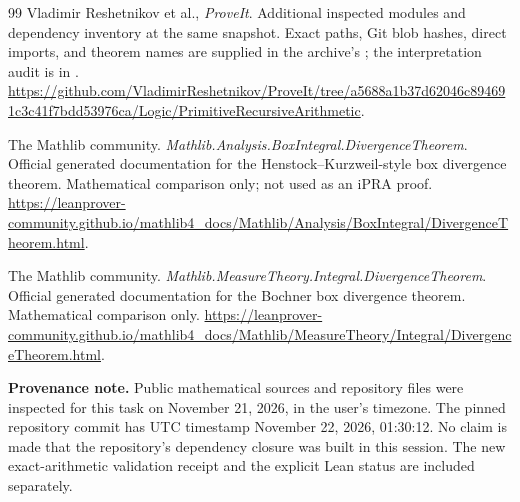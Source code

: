 \begin{thebibliography}{99}
Vladimir Reshetnikov et al., \emph{ProveIt}.
Additional inspected modules and dependency inventory at the same
snapshot. Exact paths, Git blob hashes, direct imports, and theorem
names are supplied in the archive's
;
the interpretation audit is in
.
\url{https://github.com/VladimirReshetnikov/ProveIt/tree/a5688a1b37d62046c894691c3c41f7bdd53976ca/Logic/PrimitiveRecursiveArithmetic}.

The Mathlib community.
\emph{Mathlib.Analysis.BoxIntegral.DivergenceTheorem}.
Official generated documentation for the Henstock--Kurzweil-style
box divergence theorem. Mathematical comparison only; not used as
an iPRA proof.
\url{https://leanprover-community.github.io/mathlib4_docs/Mathlib/Analysis/BoxIntegral/DivergenceTheorem.html}.

The Mathlib community.
\emph{Mathlib.MeasureTheory.Integral.DivergenceTheorem}.
Official generated documentation for the Bochner box divergence
theorem. Mathematical comparison only.
\url{https://leanprover-community.github.io/mathlib4_docs/Mathlib/MeasureTheory/Integral/DivergenceTheorem.html}.

\end{thebibliography}

\noindent\textbf{Provenance note.}
Public mathematical sources and repository files were inspected for this
task on November 21, 2026, in the user's timezone. The pinned repository
commit has UTC timestamp November 22, 2026, 01:30:12.
No claim is made that the repository's dependency closure was built in
this session. The new exact-arithmetic validation receipt and the
explicit Lean status are included separately.
\endgroup
